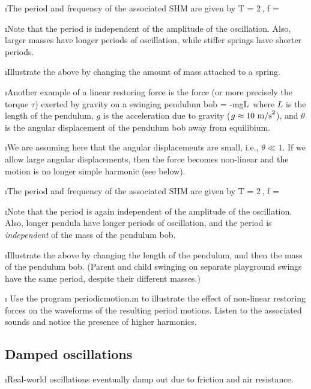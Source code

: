 \i The period and frequency of the associated SHM are
given by
%
\be
T = {2\pi}\,,
\quad
f = 
\ee

\i Note that the period is independent of the amplitude
of the oscillation.
Also, larger masses have longer periods of 
oscillation, while stiffer springs have shorter periods.

\i \demo Illustrate the above by changing the amount of mass
attached to a spring.

\i Another example of a linear restoring force is the force 
(or more precisely the torque $\tau$) 
exerted by gravity on a swinging pendulum bob
%
\be
\tau =  -mgL\,\theta
\ee
%
where $L$ is the length of the pendulum,
$g$ is the acceleration due to gravity ($g\approx 10~{\rm m/s}^2$),
and $\theta$ is the angular displacement of the pendulum 
bob away from equilibium.

\i We are assuming here that the angular displacements
are small, i.e., $\theta \ll 1$.
If we allow large angular displacements, then the force becomes 
non-linear and the motion is no longer simple harmonic
(see below).

\i The period and frequency of the associated SHM are
given by
%
\be
T = {2\pi}\,,
\quad
f = 
\ee

\i Note that the period is again independent of the amplitude
of the oscillation.
Also, longer pendula have longer periods of oscillation, and
the period is {\em independent} of the mass of the pendulum bob.

\i \demo Illustrate the above by changing the length of the 
pendulum, and then the mass of the pendulum bob.
(Parent and child swinging on separate playground swings
have the same period, despite their different masses.)

\i \demo
Use the program periodicmotion.m to illustrate the effect
of non-linear restoring forces on the waveforms of the 
resulting period motions.
Listen to the associated sounds and notice the presence of 
higher harmonics.

\ei

\subsection{Damped oscillations}

\bi

\i Real-world oscillations eventually damp out due to 
friction and air resistance.


